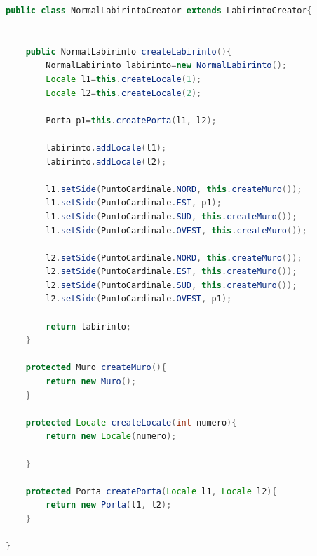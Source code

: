 \documentclass{article}
\begin{document}
\begin{lstlisting}[language=Java]
public class NormalLabirintoCreator extends LabirintoCreator{
	
	
	public NormalLabirinto createLabirinto(){
		NormalLabirinto labirinto=new NormalLabirinto();
		Locale l1=this.createLocale(1);
		Locale l2=this.createLocale(2);
		
		Porta p1=this.createPorta(l1, l2);
		
		labirinto.addLocale(l1);
		labirinto.addLocale(l2);
		
		l1.setSide(PuntoCardinale.NORD, this.createMuro());
		l1.setSide(PuntoCardinale.EST, p1);
		l1.setSide(PuntoCardinale.SUD, this.createMuro());
		l1.setSide(PuntoCardinale.OVEST, this.createMuro());
		
		l2.setSide(PuntoCardinale.NORD, this.createMuro());
		l2.setSide(PuntoCardinale.EST, this.createMuro());
		l2.setSide(PuntoCardinale.SUD, this.createMuro());
		l2.setSide(PuntoCardinale.OVEST, p1);
		
		return labirinto;
	}
	
	protected Muro createMuro(){
		return new Muro();
	}
	
	protected Locale createLocale(int numero){
		return new Locale(numero);
		
	}
	
	protected Porta createPorta(Locale l1, Locale l2){
		return new Porta(l1, l2);
	}
	
}
\end{lstlisting}
\end{document}
